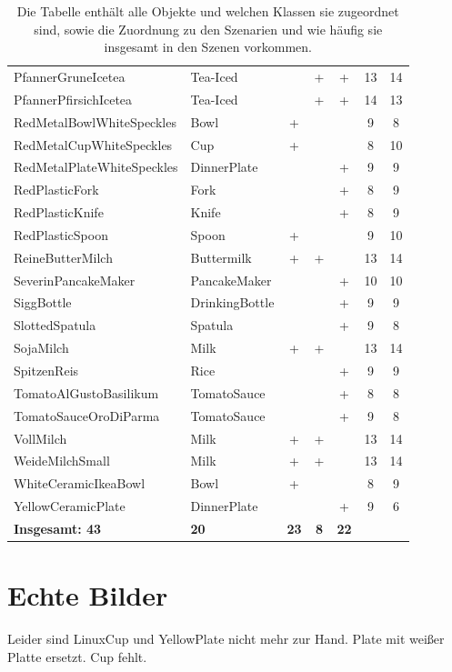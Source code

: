\begin{table}
\begin{tabularx}{\textwidth}{llccccc}
PfannerGruneIcetea				& Tea-Iced			& 			& +			&	+		& 13	& 14\\
PfannerPfirsichIcetea			& Tea-Iced			& 			& +			&	+		& 14	& 13\\
RedMetalBowlWhiteSpeckles		& Bowl				& +			& 			&			& 9		& 8\\
RedMetalCupWhiteSpeckles		& Cup				& +			& 			&			& 8		& 10\\
RedMetalPlateWhiteSpeckles		& DinnerPlate		& 			& 			&	+		& 9		& 9\\
RedPlasticFork					& Fork				& 			& 			&	+		& 8		& 9\\
RedPlasticKnife					& Knife				& 			& 			&	+		& 8		& 9\\
RedPlasticSpoon					& Spoon				& +			& 			&			& 9		& 10\\
ReineButterMilch				& Buttermilk		& +			& +			&			& 13	& 14\\
SeverinPancakeMaker				& PancakeMaker		& 			& 			&	+		& 10	& 10\\
SiggBottle						& DrinkingBottle	& 			& 			&	+		& 9		& 9\\
SlottedSpatula					& Spatula			& 			& 			&	+		& 9		& 8\\
SojaMilch						& Milk				& +			& +			&			& 13	& 14\\
SpitzenReis						& Rice				& 			& 			&	+		& 9		& 9\\
TomatoAlGustoBasilikum			& TomatoSauce		& 			& 			&	+		& 8		& 8\\
TomatoSauceOroDiParma			& TomatoSauce		& 			& 			&	+		& 9		& 8\\
VollMilch						& Milk				& +			& +			&			& 13	& 14\\
WeideMilchSmall					& Milk				& +			& +			&			& 13	& 14\\
WhiteCeramicIkeaBowl			& Bowl				& +			& 			&			& 8		& 9\\
YellowCeramicPlate				& DinnerPlate 	    & 			& 			&	+		& 9		& 6\\ \hline
\textbf{Insgesamt: 43}				& \textbf{20}		& \textbf{23} & \textbf{8} & \textbf{22} & & \\
\end{tabularx}
\caption[Objekte und ihre Verteilung in den Szenen]{Die Tabelle enthält alle Objekte und welchen Klassen sie zugeordnet sind, sowie die Zuordnung zu den Szenarien und wie häufig sie insgesamt in den Szenen vorkommen.}
\label{tab:objects}
\end{table}


\section{Echte Bilder}
  
Leider sind LinuxCup und YellowPlate nicht mehr zur Hand. Plate mit weißer Platte ersetzt. Cup fehlt.